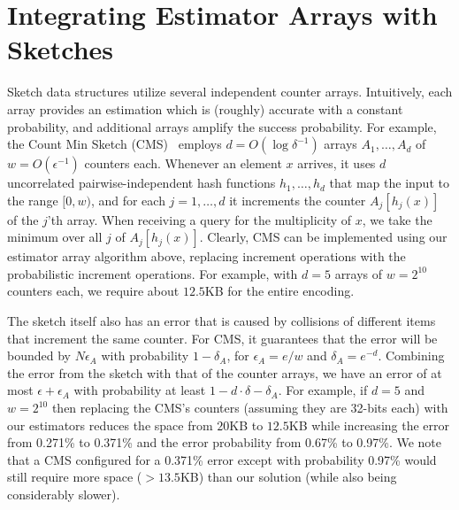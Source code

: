 \section{Integrating Estimator Arrays with Sketches}\label{sec:counterArrays}
Sketch data structures utilize several independent counter arrays. 
Intuitively, each array provides an estimation which is (roughly) accurate with a constant probability, and additional arrays amplify the success probability.
For example, the Count Min Sketch (CMS)~\cite{CountMinSketch} employs $d=O(\log\delta^{-1})$ arrays $A_1,\ldots,A_d$ of $w=O(\epsilon^{-1})$ counters each. Whenever an element $x$ arrives, it uses $d$ uncorrelated pairwise-independent hash functions $h_1,\ldots,h_d$ that map the input to the range $[0,w)$, and for each $j=1,\ldots,d$ it increments the counter $A_j[h_j(x)]$ of the $j$'th array.
When receiving a query for the multiplicity of $x$, we take the minimum over all $j$ of $A_j[h_j(x)]$.  Clearly, CMS can be implemented using our estimator array algorithm above, replacing increment operations with the probabilistic increment operations. For example, with $d=5$ arrays of $w=2^{10}$ counters each, we require about $12.5$KB for the entire encoding.

The sketch itself also has an error that is caused by collisions of different items that increment the same counter. For CMS, it guarantees that the error will be bounded by $N\epsilon_A$ with probability $1-\delta_A$, for $\epsilon_A = e/w$ and $\delta_A=e^{-d}$. Combining the error from the sketch with that of the counter arrays, we have an error of at most $\epsilon+\epsilon_A$ with probability at least $1-d\cdot \delta-\delta_A$. For example, if $d=5$ and $w=2^{10}$ then replacing the CMS's counters (assuming they are 32-bits each) with our estimators reduces the space from $20$KB to $12.5$KB while increasing the error from 0.271\% to 0.371\% and the error probability from 0.67\% to 0.97\%. We note that a CMS configured for a 0.371\% error except with probability 0.97\% would still require more space ($>13.5$KB) than our solution (while also being considerably slower). %


